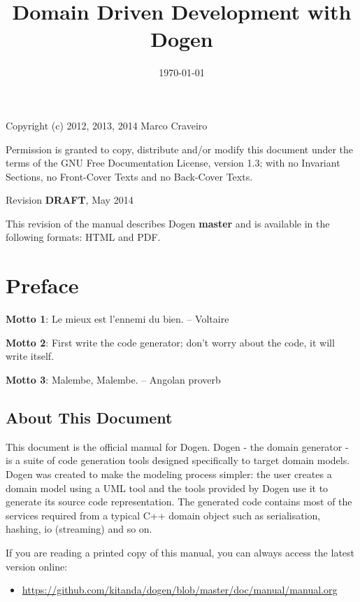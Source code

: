 \documentclass[11pt]{article}
\date{\today}
\title{Domain Driven Development with Dogen}
\begin{document}
\maketitle
\tableofcontents

Copyright (c) 2012, 2013, 2014 Marco Craveiro

Permission is granted to copy, distribute and/or modify this document under the
terms of the GNU Free Documentation License, version 1.3; with no Invariant
Sections, no Front-Cover Texts and no Back-Cover Texts.

Revision \textbf{DRAFT}, May 2014

This revision of the manual describes Dogen \textbf{master} and is available
in the following formats: HTML and PDF.

\setcounter{tocdepth}{2}
\tableofcontents
\listoffigures
\listoftables

\section{Preface}
\label{sec-1}

\textbf{Motto 1}: Le mieux est l'ennemi du bien. -- Voltaire

\textbf{Motto 2}: First write the code generator; don't worry about the code,
it will write itself.

\textbf{Motto 3}: Malembe, Malembe. -- Angolan proverb

\subsection{About This Document}
\label{sec-1-1}

This document is the official manual for Dogen. Dogen - the domain
generator - is a suite of code generation tools designed specifically
to target domain models. Dogen was created to make the modeling
process simpler: the user creates a domain model using a UML tool and
the tools provided by Dogen use it to generate its source code
representation. The generated code contains most of the services
required from a typical C++ domain object such as serialisation,
hashing, io (streaming) and so on.

If you are reading a printed copy of this manual, you can always
access the latest version online:

\begin{itemize}
\item \url{https://github.com/kitanda/dogen/blob/master/doc/manual/manual.org}
\end{itemize}
\end{document}
